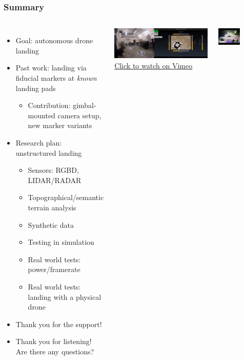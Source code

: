 \documentclass[aspectratio=169]{rubeamer}
\newif\ifpause
\newcommand{\mypause}{\ifpause \pause \fi}
\begin{document}
\begin{frame}
  \frametitle{Summary}
  \begin{columns}
      \begin{itemize}
        \item Goal: autonomous drone landing
        \mypause
        \item Past work: landing via fiducial markers at \textit{known} landing pads
        \begin{itemize}
          \item Contribution: gimbal-mounted camera setup, new marker variants
        \end{itemize}
        \mypause
        \item Research plan: unstructured landing
        \begin{itemize}
          \mypause
          \item Sensors: RGBD, LIDAR/RADAR
          \mypause
          \item Topographical/semantic terrain analysis
          \mypause
          \item Synthetic data
          \mypause
          \item Testing in simulation
          \mypause
          \item Real world tests: power/framerate
          \mypause
          \item Real world tests: landing with a physical drone
          \mypause
        \end{itemize}
        \item Thank you for the support!
        \item Thank you for listening! Are there any questions?
      \end{itemize}

      \centering

      \onslide
      \includegraphics[width=\textwidth]{demo_screenshot}\\\href{https://vimeo.com/664863992}{\color{blue}Click to watch on Vimeo}\vspace{1cm}

      \includegraphics[width=0.5\textwidth]{airsim}
  \end{columns}
\end{frame}
\end{document}
